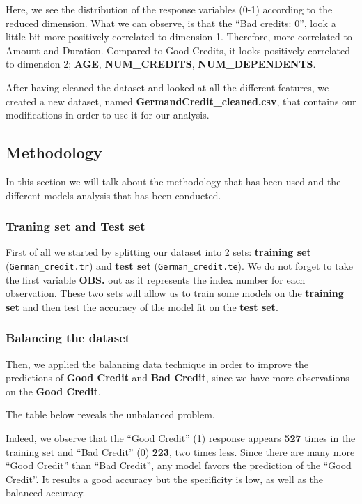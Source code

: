 \documentclass[
]{article}
\begin{document}
Here, we see the distribution of the response variables (0-1) according
to the reduced dimension. What we can observe, is that the ``Bad
credits: 0'', look a little bit more positively correlated to dimension
1. Therefore, more correlated to Amount and Duration. Compared to Good
Credits, it looks positively correlated to dimension 2; \textbf{AGE},
\textbf{NUM\_CREDITS}, \textbf{NUM\_DEPENDENTS}.

After having cleaned the dataset and looked at all the different
features, we created a new dataset, named
\textbf{GermandCredit\_cleaned.csv}, that contains our modifications in
order to use it for our analysis.

\hypertarget{methodology}{%
\subsection{Methodology}\label{methodology}}

In this section we will talk about the methodology that has been used
and the different models analysis that has been conducted.

\hypertarget{traning-set-and-test-set}{%
\subsubsection{Traning set and Test
set}\label{traning-set-and-test-set}}

First of all we started by splitting our dataset into 2 sets:
\textbf{training set} (\texttt{German\_credit.tr}) and \textbf{test set}
(\texttt{German\_credit.te}). We do not forget to take the first
variable \textbf{OBS.} out as it represents the index number for each
observation. These two sets will allow us to train some models on the
\textbf{training set} and then test the accuracy of the model fit on the
\textbf{test set}.

\hypertarget{balancing-the-dataset}{%
\subsubsection{Balancing the dataset}\label{balancing-the-dataset}}

Then, we applied the balancing data technique in order to improve the
predictions of \textbf{Good Credit} and \textbf{Bad Credit}, since we
have more observations on the \textbf{Good Credit}.

The table below reveals the unbalanced problem.

Indeed, we observe that the ``Good Credit'' (1) response appears
\textbf{527} times in the training set and ``Bad Credit'' (0)
\textbf{223}, two times less. Since there are many more ``Good Credit''
than ``Bad Credit'', any model favors the prediction of the ``Good
Credit''. It results a good accuracy but the specificity is low, as well
as the balanced accuracy.
\end{document}
